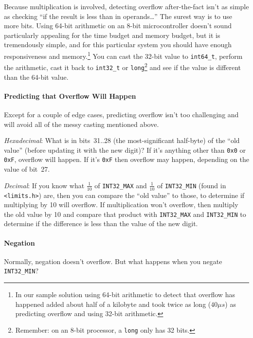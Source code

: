 {    Because multiplication is involved, detecting overflow after-the-fact isn't as simple as checking ``if the result is less than in operands\dots''
    The surest way is to use more bits.
    Using 64-bit arithmetic on an 8-bit microcontroller doesn't sound particularly appealing for the time budget and memory budget, but it is tremendously simple, and for this particular system you should have enough responsiveness and memory.\footnote{
        In our sample solution using 64-bit arithmetic to detect that overflow has happened added about half of a kilobyte and took twice as long ($40\mu s$) as predicting overflow and using 32-bit arithmetic.
    }
    You can cast the 32-bit value to \lstinline{int64_t}, perform the arithmetic, cast it back to \lstinline{int32_t} or \lstinline{long}\footnote{
        Remember: on an 8-bit processor, a \lstinline{long} only has 32 bits.
    } and see if the value is different than the 64-bit value.


    \paragraph{Predicting that Overflow Will Happen}

    Except for a couple of edge cases, predicting overflow isn't too challenging and will avoid all of the messy casting mentioned above.

    \textit{Hexadecimal}: What is in bits~31..28 (the most-significant half-byte) of the ``old value'' (before updating it with the new digit)?
    If it's anything other than \lstinline{0x0} or \lstinline{0xF}, overflow will happen.
    If it's \lstinline{0xF} then overflow may happen, depending on the value of bit~27.

    \textit{Decimal}: If you know what $\frac{1}{10}$ of \lstinline{INT32_MAX} and $\frac{1}{10}$ of \lstinline{INT32_MIN} (found in \lstinline{<limits.h>}) are, then you can compare the ``old value'' to those, to determine if multiplying by 10 will overflow.
    If multiplication won't overflow, then multiply the old value by 10 and compare that product with \lstinline{INT32_MAX} and \lstinline{INT32_MIN} to determine if the difference is less than the value of the new digit.

    \paragraph{Negation}

    Normally, negation doesn't overflow.
    But what happens when you negate \lstinline{INT32_MIN}?

}{}
